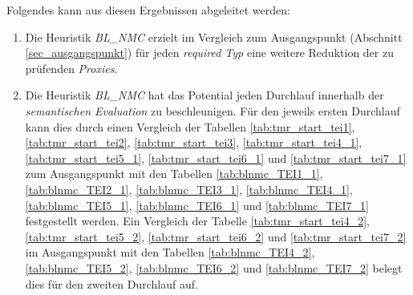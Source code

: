 \begin{multicols}{2}
\end{multicols}
\pagebreak
\begin{multicols}{2}
\end{multicols}
\noindent
Folgendes kann aus diesen Ergebnissen abgeleitet werden:
\begin{enumerate}
\item Die \Gls{Heuristik} \emph{BL\_NMC} erzielt im Vergleich zum Ausgangspunkt (Abschnitt \ref{sec_ausgangspunkt}) für jeden \emph{required Typ} eine weitere Reduktion der zu prüfenden \emph{Proxies}.

\item Die Heuristik \emph{BL\_NMC} hat das Potential jeden Durchlauf innerhalb der \emph{semantischen Evaluation} zu beschleunigen. Für den jeweils ersten Durchlauf kann dies durch einen Vergleich der Tabellen \ref{tab:tmr_start_tei1}, \ref{tab:tmr_start_tei2}, \ref{tab:tmr_start_tei3}, \ref{tab:tmr_start_tei4_1}, \ref{tab:tmr_start_tei5_1}, \ref{tab:tmr_start_tei6_1} und \ref{tab:tmr_start_tei7_1} zum Ausgangspunkt mit den Tabellen \ref{tab:blnmc_TEI1_1}, \ref{tab:blnmc_TEI2_1}, \ref{tab:blnmc_TEI3_1}, \ref{tab:blnmc_TEI4_1}, \ref{tab:blnmc_TEI5_1}, \ref{tab:blnmc_TEI6_1} und \ref{tab:blnmc_TEI7_1} festgestellt werden. Ein Vergleich der Tabelle \ref{tab:tmr_start_tei4_2}, \ref{tab:tmr_start_tei5_2}, \ref{tab:tmr_start_tei6_2} und \ref{tab:tmr_start_tei7_2} im Ausgangspunkt mit den Tabellen \ref{tab:blnmc_TEI4_2}, \ref{tab:blnmc_TEI5_2}, \ref{tab:blnmc_TEI6_2} und \ref{tab:blnmc_TEI7_2} belegt dies für den zweiten Durchlauf auf.
\end{enumerate}
